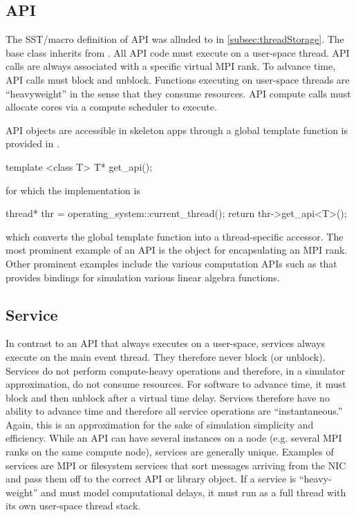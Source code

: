 \subsection{API}
\label{subsec:softwareAPI}
The SST/macro definition of API was alluded to in \ref{subsec:threadStorage}.
The base  class inherits from .
All API code must execute on a user-space thread.
API calls are always associated with a specific virtual MPI rank.
To advance time, API calls must block and unblock.
Functions executing on user-space threads are ``heavyweight'' in the sense that they consume resources.
API compute calls must allocate cores via a compute scheduler to execute.


API objects are accessible in skeleton apps through a global template function is provided in .
\begin{CppCode}
template <class T>
T* get_api();
\end{CppCode}
for which the implementation is

\begin{CppCode}
thread* thr = operating_system::current_thread();
return thr->get_api<T>();
\end{CppCode}
which converts the global template function into a thread-specific accessor.
The most prominent example of an API is the  object for encapsulating an MPI rank.
Other prominent examples include the various computation APIs such as  that provides bindings for simulation various linear algebra functions.


\subsection{Service}
\label{subsec:service}
In contrast to an API that always executes on a user-space, services always execute on the main event thread.
They therefore never block (or unblock).
Services do not perform compute-heavy operations and therefore, in a simulator approximation, do not consume resources. 
For software to advance time, it must block and then unblock after a virtual time delay.
Services therefore have no ability to advance time and therefore all service operations are ``instantaneous.''
Again, this is an approximation for the sake of simulation simplicity and efficiency.
While an API can have several instances on a node (e.g. several MPI ranks on the same compute node), services are generally unique.
Examples of services are MPI or filesystem services that sort messages arriving from the NIC and pass them off to the correct API or library object.
If a service is ``heavy-weight'' and must model computational delays,
it must run as a full thread with its own user-space thread stack.


